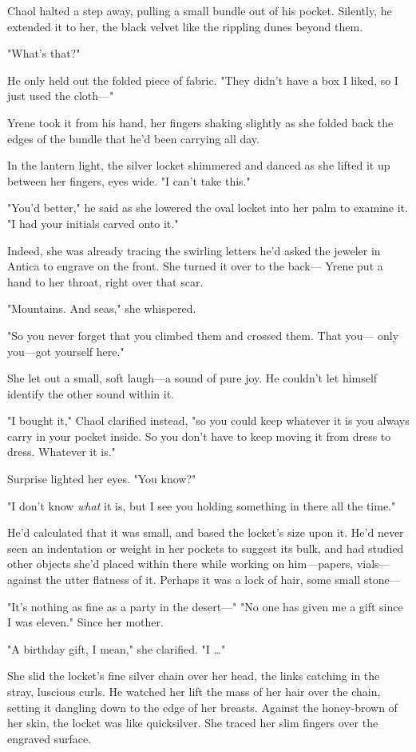 Chaol halted a step away, pulling a small bundle out of his pocket.
Silently, he extended it to her, the black velvet like the rippling dunes beyond them.

"What's that?"

He only held out the folded piece of fabric.
"They didn't have a box I liked, so I just used the cloth---"

Yrene took it from his hand, her fingers shaking slightly as she folded back the edges of the bundle that he'd been carrying all day.

In the lantern light, the silver locket shimmered and danced as she lifted it up between her fingers, eyes wide.
"I can't take this."

"You'd better," he said as she lowered the oval locket into her palm to examine it.
"I had your initials carved onto it."

Indeed, she was already tracing the swirling letters he'd asked the jeweler in Antica to engrave on the front.
She turned it over to the back--- Yrene put a hand to her throat, right over that scar.

"Mountains.
And seas," she whispered.

"So you never forget that you climbed them and crossed them.
That you--- only you---got yourself here."

She let out a small, soft laugh---a sound of pure joy.
He couldn't let himself identify the other sound within it.

"I bought it," Chaol clarified instead, "so you could keep whatever it is you always carry in your pocket inside.
So you don't have to keep moving it from dress to dress.
Whatever it is."

Surprise lighted her eyes.
"You know?"

"I don't know \emph{what} it is, but I see you holding something in there all the time."

He'd calculated that it was small, and based the locket's size upon it.
He'd never seen an indentation or weight in her pockets to suggest its bulk, and had studied other objects she'd placed within there while working on him---papers, vials---against the utter flatness of it.
Perhaps it was a lock of hair, some small stone---

"It's nothing as fine as a party in the desert---" "No one has given me a gift since I was eleven."
Since her mother.

"A birthday gift, I mean," she clarified.
"I \ldots"

She slid the locket's fine silver chain over her head, the links catching in the stray, luscious curls.
He watched her lift the mass of her hair over the chain, setting it dangling down to the edge of her breasts.
Against the honey-brown of her skin, the locket was like quicksilver.
She traced her slim fingers over the engraved surface.

